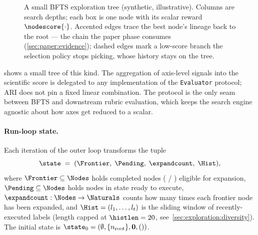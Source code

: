 \begin{figure}[t]
  \centering
  \resizebox{\columnwidth}{!}{}
  \caption{A small BFTS exploration tree (synthetic, illustrative).
           Columns are search depths; each box is one node with its
           scalar reward $\nodescore{\cdot}$. Accented edges trace the
           best node's lineage back to the root --- the chain the
           paper phase consumes (\cref{sec:paper:evidence}); dashed
           edges mark a low-score branch the selection policy stops
           picking, whose history stays on the tree.}
  \label{fig:tree}
\end{figure}

 shows a small tree of this kind. The aggregation of
axis-level signals into the scientific score is delegated to any
implementation of the \texttt{Evaluator} protocol; ARI does not pin a
fixed linear combination. The protocol is the only seam between BFTS
and downstream rubric evaluation, which keeps the search engine
agnostic about how axes get reduced to a scalar.

\paragraph{Run-loop state.}
Each iteration of the outer loop transforms the tuple
\[
  \state \;=\; (\Frontier,\;\Pending,\;\expandcount,\;\Hist),
\]
where $\Frontier\subseteq\Nodes$ holds completed nodes
(\StateDone{} / \StateFailed{}) eligible for expansion, $\Pending\subseteq\Nodes$
holds nodes in state \StateOpen{} ready to execute, $\expandcount:\Nodes\to\Naturals$
counts how many times each frontier node has been expanded, and
$\Hist=(l_1,\ldots,l_t)$ is the sliding window of recently-executed
labels (length capped at $\histlen=20$, see~\cref{sec:exploration:diversity}).
The initial state is $\state_0=(\emptyset,\{n_\mathrm{root}\},\mathbf{0},())$.

